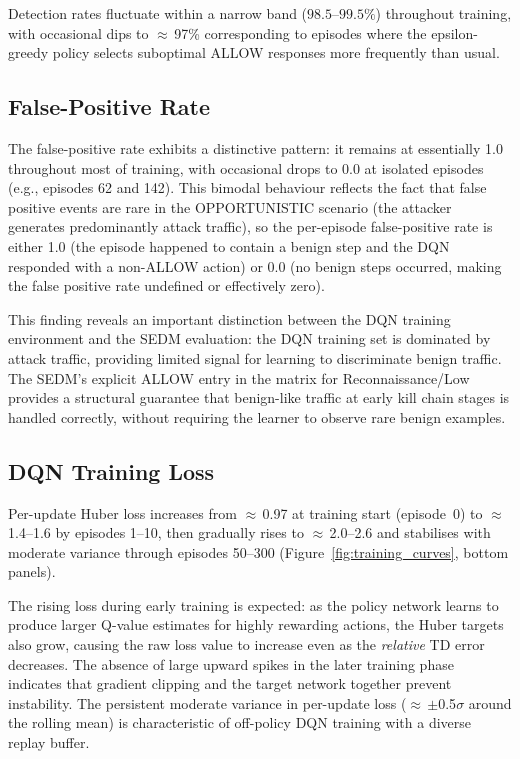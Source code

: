 Detection rates fluctuate within a narrow band ($98.5$--$99.5\%$) throughout
training, with occasional dips to $\approx$\,97\% corresponding to episodes
where the epsilon-greedy policy selects suboptimal ALLOW responses more
frequently than usual.

\subsection{False-Positive Rate}

The false-positive rate exhibits a distinctive pattern: it remains at
essentially 1.0 throughout most of training, with occasional drops to 0.0
at isolated episodes (e.g., episodes 62 and 142).
This bimodal behaviour reflects the fact that false positive events are
rare in the OPPORTUNISTIC scenario (the attacker generates predominantly
attack traffic), so the per-episode false-positive rate is either 1.0
(the episode happened to contain a benign step and the DQN responded
with a non-ALLOW action) or 0.0 (no benign steps occurred, making the
false positive rate undefined or effectively zero).

This finding reveals an important distinction between the DQN training
environment and the SEDM evaluation: the DQN training set is dominated
by attack traffic, providing limited signal for learning to discriminate
benign traffic.
The SEDM's explicit ALLOW entry in the matrix for Reconnaissance/Low
provides a structural guarantee that benign-like traffic at early kill
chain stages is handled correctly, without requiring the learner to observe
rare benign examples.

\subsection{DQN Training Loss}

Per-update Huber loss increases from $\approx$\,0.97 at training start
(episode~0) to $\approx$\,1.4--1.6 by episodes 1--10, then gradually
rises to $\approx$\,2.0--2.6 and stabilises with moderate variance through
episodes 50--300 (Figure~\ref{fig:training_curves}, bottom panels).

The rising loss during early training is expected: as the policy network
learns to produce larger Q-value estimates for highly rewarding actions, the
Huber targets also grow, causing the raw loss value to increase even as the
\emph{relative} TD error decreases.
The absence of large upward spikes in the later training phase indicates
that gradient clipping and the target network together prevent instability.
The persistent moderate variance in per-update loss ($\approx$\,$\pm$0.5$\sigma$
around the rolling mean) is characteristic of off-policy DQN training with a
diverse replay buffer.

